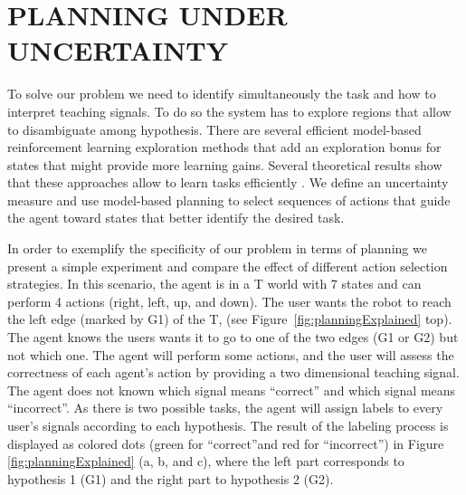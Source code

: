 \section{PLANNING UNDER UNCERTAINTY}
\label{sec:planning}


To solve our problem we need to identify simultaneously the task and how to interpret teaching signals. To do so the system has to explore regions that allow to disambiguate among hypothesis. There are several efficient model-based reinforcement learning exploration methods that add an exploration bonus for states that might provide more learning gains. Several theoretical results show that these approaches allow to learn tasks efficiently \cite{brafman2003r,kolter2009near}. We define an uncertainty measure and use model-based planning to select sequences of actions that guide the agent toward states that better identify the desired task.

In order to exemplify the specificity of our problem in terms of planning we present a simple experiment and compare the effect of different action selection strategies. In this scenario, the agent is in a T world with 7 states and can perform 4 actions (right, left, up, and down). The user wants the robot to reach the left edge (marked by G1) of the T, (see Figure~\ref{fig:planningExplained} top). The agent knows the users wants it to go to one of the two edges (G1 or G2) but not which one. The agent will perform some actions, and the user will assess the correctness of each agent's action by providing a two dimensional teaching signal. The agent does not known which signal means ``correct'' and which signal means ``incorrect''. As there is two possible tasks, the agent will assign labels to every user's signals according to each hypothesis. The result of the labeling process is displayed as colored dots (green for ``correct''and red for ``incorrect'') in Figure \ref{fig:planningExplained} (a, b, and c), where the left part corresponds to hypothesis 1 (G1) and the right part to hypothesis 2 (G2).

